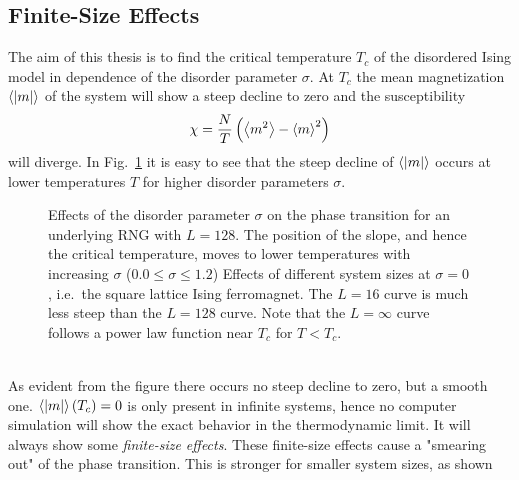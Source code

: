 \subsection{Finite-Size Effects}
\label{ssec:finitesize}
    The aim of this thesis is to find the critical temperature \(T_c\)
    of the disordered Ising model in dependence of the disorder parameter
    \(\sigma\). At \(T_c\) the mean magnetization \(\left< |m| \right>\) of
    the system will show a steep decline to zero and the susceptibility
    \begin{equation}
        \chi = \frac{N}{T}\left(\left< m^2 \right>-\left< m \right>^2\right)
    \end{equation}
    will diverge. In Fig.\ \ref{fig:smeared_out}
    it is easy to see that the steep decline of \(\left< |m| \right>\)
    occurs at lower temperatures \(T\) for higher
    disorder parameters \(\sigma\).
    \begin{figure}[htbp]
        \centering
        \caption[Phase Transition and Finite Size Effects]
        {
             Effects of the disorder
            parameter $\sigma$ on the phase transition
            for an underlying RNG with $L=128$. The position of the slope,
            and hence the critical temperature, moves to lower temperatures
            with increasing \(\sigma\) (\(0.0 \le \sigma \le 1.2\))
             Effects of different system
            sizes at \(\sigma = 0\), i.e.\ the square lattice Ising ferromagnet.
            The \(L=16\) curve is much less steep than the \(L=128\) curve.
            Note that the \(L=\infty\) curve follows a power law function near \(T_c\) for \(T < T_{c}\).
        }
        \label{fig:smeared_out}
    \end{figure}\\
    As evident from the figure there occurs no steep decline to zero, but a
    smooth one. \(\left< \left\vert m\right\vert \right>(T_c) = 0\) is only present in infinite
    systems, hence no computer simulation will show the exact behavior in the
    thermodynamic limit. It will always show some \emph{finite-size effects}.
    These finite-size effects cause a "smearing out" of the phase
    transition. This is stronger for smaller system sizes, as shown
